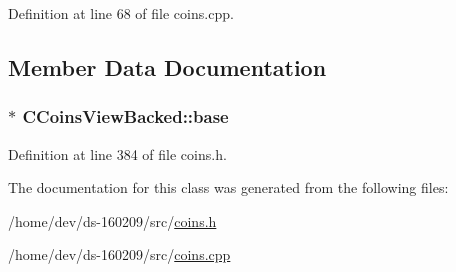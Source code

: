 Definition at line 68 of file coins.\+cpp.



\subsection{Member Data Documentation}
\hypertarget{class_c_coins_view_backed_a901472317114adc4c104efd61dcf6203}{}
\subsubsection[{base}]{$\ast$ C\+Coins\+View\+Backed\+::base\hspace{0.3cm}{\ttfamily [protected]}}\label{class_c_coins_view_backed_a901472317114adc4c104efd61dcf6203}


Definition at line 384 of file coins.\+h.



The documentation for this class was generated from the following files\+:\begin{DoxyCompactItemize}
\item 
/home/dev/ds-\/160209/src/\hyperlink{coins_8h}{coins.\+h}\item 
/home/dev/ds-\/160209/src/\hyperlink{coins_8cpp}{coins.\+cpp}\end{DoxyCompactItemize}
